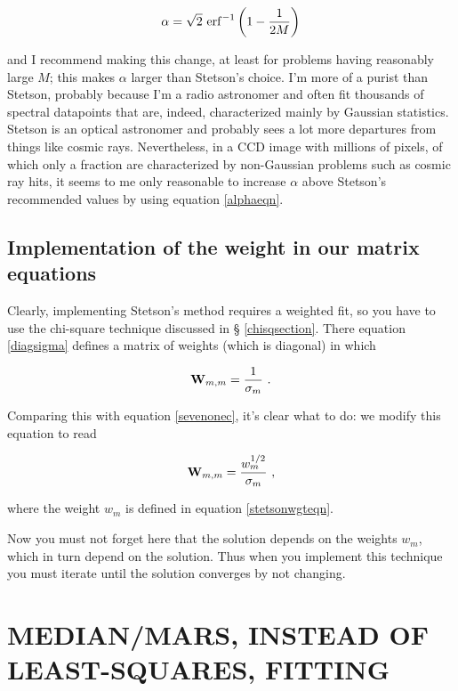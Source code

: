 \documentclass[psfig,preprint]{aastex}
\begin{document}
\begin{equation} \label{alphaeqn}
\alpha = \sqrt{2} \ {\rm erf}^{-1}\left( {1 - {1 \over 2M}} \right)
\end{equation}

\noindent and I recommend making this change, at least for problems
having reasonably large $M$; this makes $\alpha$ larger than Stetson's
choice. I'm more of a purist than Stetson, probably because I'm a radio
astronomer and often fit thousands of spectral datapoints that are,
indeed, characterized mainly by Gaussian statistics. Stetson is an
optical astronomer and probably sees a lot more departures from things
like cosmic rays. Nevertheless, in a CCD image with millions of pixels,
of which only a fraction are characterized by non-Gaussian problems such
as cosmic ray hits, it seems to me only reasonable to increase $\alpha$
above Stetson's recommended values by using equation \ref{alphaeqn}.

\subsection{Implementation of the weight in our matrix equations}

	Clearly, implementing Stetson's method requires a weighted fit,
so you have to use the chi-square technique discussed in \S
\ref{chisqsection}. There equation \ref{diagsigma} defines a matrix of
weights (which is diagonal) in which

\begin{equation}
{\bf W}_{m,m} = {1 \over \sigma_m} \ .
\end{equation}

\noindent Comparing this with equation \ref{sevenonec}, it's clear what
to do: we modify this equation to read

\begin{equation} \label{wgteqntwo}
{\bf W}_{m,m} = {w_m^{1/2} \over \sigma_m} \ ,
\end{equation}

\noindent where the weight $w_m$ is defined in equation
\ref{stetsonwgteqn}.

	Now you must not forget here that the solution depends on the
weights $w_m$, which in turn depend on the solution. Thus when you
implement this technique you must iterate until the solution converges
by not changing. 

\section{MEDIAN/MARS, INSTEAD OF LEAST-SQUARES, FITTING}
\end{document}
